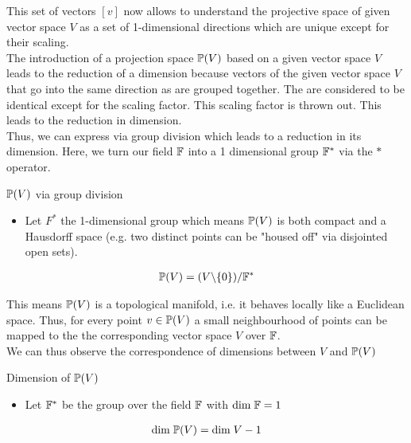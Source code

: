 This set of vectors $[v]$ now allows to understand the projective space of given vector space $V$ as a set of 1-dimensional directions which are unique except for their scaling. \\
The introduction of a projection space $\mathbb{P}(V)$ based on a given vector space $V$ leads to the reduction of a dimension because vectors of the given vector space $V$ that go into the same direction as are grouped together. The are considered to be identical except for the scaling factor. This scaling factor is thrown out. This leads to the reduction in dimension. \\
Thus, we can express via group division which leads to a reduction in its dimension. Here, we turn our field $\mathbb{F}$ into a 1 dimensional group $\mathbb{F}^*$ via the $*$ operator.

\begin{definitionBox}{$\mathbb{P}(V)$ via group division}
    \begin{itemize}
        \item Let $F^*$ the 1-dimensional group which means $\mathbb{P}(V)$ is both compact and a Hausdorff space (e.g. two distinct points can be "housed off" via disjointed open sets).
    \end{itemize}
    \begin{gather*}
        \mathbb{P}(V) = (V \backslash \{ 0 \}) /\mathbb{F}^*
    \end{gather*}
\end{definitionBox}

This means $\mathbb{P}(V)$ is a topological manifold, i.e. it behaves locally like a Euclidean space. Thus, for every point $v \in \mathbb{P}(V)$ a small neighbourhood of points can be mapped to the the corresponding vector space $V$ over $\mathbb{F}$. \\

We can thus observe the correspondence of dimensions between $V$ and $\mathbb{P}(V)$
\begin{definitionBox}{Dimension of $\mathbb{P}(V)$}
    \begin{itemize}
        \item Let $\mathbb{F}^*$ be the group over the field $\mathbb{F}$ with $\mathrm{dim}\;\mathbb{F} = 1$
    \end{itemize}
    \begin{gather*}
        \mathrm{dim}\; \mathbb{P}(V) = \mathrm{dim}\; V -1
    \end{gather*}
\end{definitionBox}


